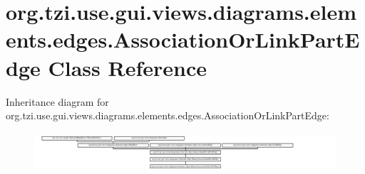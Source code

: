 \hypertarget{classorg_1_1tzi_1_1use_1_1gui_1_1views_1_1diagrams_1_1elements_1_1edges_1_1_association_or_link_part_edge}{\section{org.\-tzi.\-use.\-gui.\-views.\-diagrams.\-elements.\-edges.\-Association\-Or\-Link\-Part\-Edge Class Reference}
\label{classorg_1_1tzi_1_1use_1_1gui_1_1views_1_1diagrams_1_1elements_1_1edges_1_1_association_or_link_part_edge}
}
Inheritance diagram for org.\-tzi.\-use.\-gui.\-views.\-diagrams.\-elements.\-edges.\-Association\-Or\-Link\-Part\-Edge\-:\begin{figure}[H]
\begin{center}
\leavevmode
\includegraphics[height=1.486200cm]{classorg_1_1tzi_1_1use_1_1gui_1_1views_1_1diagrams_1_1elements_1_1edges_1_1_association_or_link_part_edge}
\end{center}
\end{figure}
